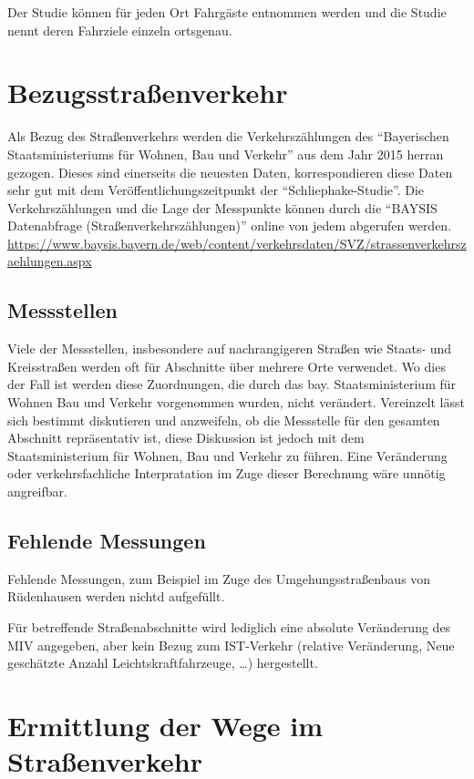 \documentclass[fontsize=12pt,a4paper]{scrreprt}
\begin{document}
Der Studie können für jeden Ort Fahrgäste entnommen werden und die Studie nennt deren Fahrziele einzeln ortsgenau.

\section{Bezugsstraßenverkehr}

Als Bezug des Straßenverkehrs werden die Verkehrszählungen des \enquote{Bayerischen Staatsministeriums für Wohnen, Bau und Verkehr} aus dem Jahr 2015 herran gezogen. Dieses sind einerseits die neuesten Daten, korrespondieren diese Daten sehr gut mit dem Veröffentlichungszeitpunkt der \enquote{Schliephake-Studie}.
Die Verkehrszählungen und die Lage der Messpunkte können durch die \enquote{BAYSIS Datenabfrage (Straßenverkehrszählungen)} online von jedem abgerufen werden.
\url{https://www.baysis.bayern.de/web/content/verkehrsdaten/SVZ/strassenverkehrszaehlungen.aspx}

\subsection{Messstellen}

Viele der Messstellen, insbesondere auf nachrangigeren Straßen wie Staats- und Kreisstraßen werden oft für Abschnitte über mehrere Orte verwendet. Wo dies der Fall ist werden diese Zuordnungen, die durch das bay. Staatsministerium für Wohnen Bau und Verkehr vorgenommen wurden, nicht verändert.
Vereinzelt lässt sich bestimmt diskutieren und anzweifeln, ob die Messstelle für den gesamten Abschnitt repräsentativ ist, diese Diskussion ist jedoch mit dem Staatsministerium für Wohnen, Bau und Verkehr zu führen. Eine Veränderung oder verkehrsfachliche Interpratation im Zuge dieser Berechnung wäre unnötig angreifbar.

\subsection{Fehlende Messungen}

Fehlende Messungen, zum Beispiel im Zuge des Umgehungsstraßenbaus von Rüdenhausen werden nichtd aufgefüllt.

Für betreffende Straßenabschnitte wird lediglich eine absolute Veränderung des MIV angegeben, aber kein Bezug zum IST-Verkehr (relative Veränderung, Neue geschätzte Anzahl Leichtskraftfahrzeuge, \ldots) hergestellt.

\section{Ermittlung der Wege im Straßenverkehr}
\end{document}
